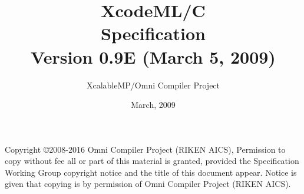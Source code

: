 \documentclass[a4paper,11pt,twoside]{article}
\title{{\Huge XcodeML/C}\\
Specification\\
\vspace{2cm}
Version 0.9E (March 5, 2009)\\ }
\author{
\Large XcalableMP/Omni Compiler Project\\
}
\date{\vspace{4cm}\Large March, 2009}
\begin{document}
\maketitle

Copyright \copyright 2008-2016 Omni Compiler Project (RIKEN AICS),
Permission to copy without fee all or part of this material is granted,
provided the {\XMP} Specification Working Group copyright notice and the
title of this document appear. Notice is given that copying is by permission
of Omni Compiler Project (RIKEN AICS).

\clearpage

\cleardoublepage

\tableofcontents
\listoffigures
\listoftables



\newpage
\mbox{}\newpage

\pagestyle{fancy}
\fancyhead{} %
\fancyhead[RE]{\leftmark}
\fancyhead[LO]{\rightmark}
\fancyhead[LE,RO]{\thepage}
\fancyfoot{} %
\renewcommand{\headrulewidth}{0pt}
\renewcommand{\footrulewidth}{0pt}












\cleardoublepage





\end{document}
